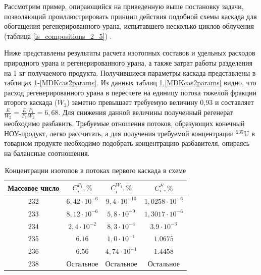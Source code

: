 Рассмотрим пример, опирающийся на приведенную выше постановку задачи, позволяющий проиллюстрировать принцип действия подобной схемы каскада для обогащения регенерированного урана, испытавшего несколько циклов облучения (таблица \ref{is_compositions_2_5}) \cite{smirnovObogashchenieRegenerirovannogoUrana2018}. 

Ниже представлены результаты расчета изотопных составов и удельных расходов природного урана и регенерированного урана, а также затрат работы разделения на 1 кг получаемого продукта. Получившиеся параметры каскада представлены в таблицах \ref{MDKcas1params}-\ref{MDKcas2params}. Из данных таблиц \ref{MDKcas1params},\ref{MDKcas2params} видно, что расход регенерированного урана в пересчете на единицу потока тяжелой фракции второго каскада ($W_{2}$) заметно превышает требуемую величину 0,93 и составляет $\frac{E}{W_{2}}=\frac{E}{P_{1}} \frac{P_{1}}{W_{2}}=6,68$. Для снижения данной величины полученный регенерат необходимо разбавить. Требуемые отношения потоков, образующих конечный НОУ-продукт, легко рассчитать, а для получения требуемой концентрации $^{235}$U в товарном продукте необходимо подобрать концентрацию разбавителя, опираясь на балансные соотношения.


\begin{table}
\begin{tabular}{|c|c|c|c|}
    \hline Массовое число & $C_{i}^{P_{1}}, \%$ & $C_{i}^{W_{1}}, \%$ & $C_{i}^{E}, \%$\\
    \hline 232 & $6,42\cdot10^{-6}$ & $9,4\cdot10^{-10}$ & $1,0258\cdot10^{-6}$\\
    233 & $8,12\cdot10^{-6}$ & $5,8\cdot10^{-9}$ & $1,3017\cdot10^{-6}$\\
    234 & $2,4\cdot10^{-2}$ & $8,3\cdot10^{-4}$ & $3.9\cdot10^{-3}$\\
    235 & $6.16$ & $1,0\cdot10^{-1}$ & $1.0675$\\
    236 & $6.56$ & $4,74\cdot10^{-1}$ & $1.4458$\\
    238 & Остальное & Остальное & Остальное\\
    \hline
\end{tabular}
\caption{Концентрации изотопов в потоках первого каскада в схеме}\label{MDKcas1params}
\end{table}


